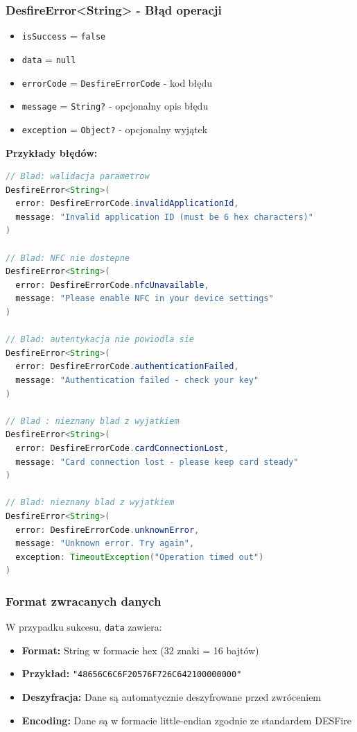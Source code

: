 \documentclass[a4paper,12pt]{article}
\begin{document}
\subsubsection*{DesfireError<String> - Błąd operacji}
\begin{itemize}
    \item \texttt{isSuccess} = \texttt{false}
    \item \texttt{data} = \texttt{null}
    \item \texttt{errorCode} = \texttt{DesfireErrorCode} - kod błędu
    \item \texttt{message} = \texttt{String?} - opcjonalny opis błędu
    \item \texttt{exception} = \texttt{Object?} - opcjonalny wyjątek
\end{itemize}

\textbf{Przykłady błędów:}
\begin{lstlisting}[language=Java]
// Blad: walidacja parametrow
DesfireError<String>(
  error: DesfireErrorCode.invalidApplicationId,
  message: "Invalid application ID (must be 6 hex characters)"
)

// Blad: NFC nie dostepne
DesfireError<String>(
  error: DesfireErrorCode.nfcUnavailable,
  message: "Please enable NFC in your device settings"
)

// Blad: autentykacja nie powiodla sie
DesfireError<String>(
  error: DesfireErrorCode.authenticationFailed,
  message: "Authentication failed - check your key"
)

// Blad : nieznany blad z wyjatkiem
DesfireError<String>(
  error: DesfireErrorCode.cardConnectionLost,
  message: "Card connection lost - please keep card steady"
)

// Blad: nieznany blad z wyjatkiem
DesfireError<String>(
  error: DesfireErrorCode.unknownError,
  message: "Unknown error. Try again",
  exception: TimeoutException("Operation timed out")
)
\end{lstlisting}

\newpage

\subsubsection*{Format zwracanych danych}
W przypadku sukcesu, \texttt{data} zawiera:
\begin{itemize}
    \item \textbf{Format:} String w formacie hex (32 znaki = 16 bajtów)
    \item \textbf{Przykład:} \texttt{"48656C6C6F20576F726C642100000000"}
    \item \textbf{Deszyfracja:} Dane są automatycznie deszyfrowane przed zwróceniem
    \item \textbf{Encoding:} Dane są w formacie little-endian zgodnie ze standardem DESFire
\end{itemize}
\end{document}

